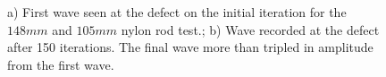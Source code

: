  
  \begin{figure}
 \begin{subfigmatrix}{2}
 \end{subfigmatrix}
 
    \caption
    { \label{fig:nylonExp1}
    a) First wave seen at the defect on the initial iteration for the $148 mm$ and $105 mm$ nylon rod test.; b) Wave recorded at the defect after 150 iterations. The final wave more than tripled in amplitude from the first wave.
  }
 \end{figure}
 
